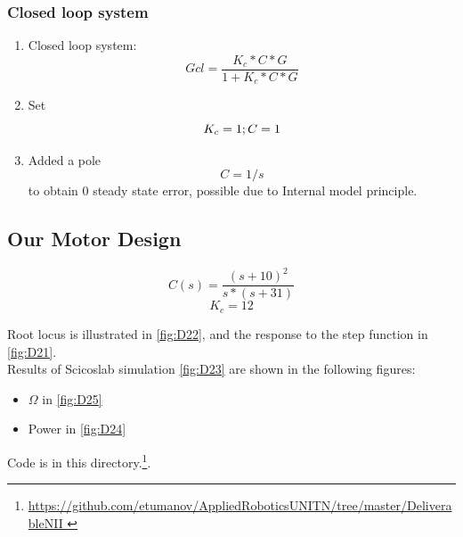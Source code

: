 \documentclass[a4paper,12pt,oneside]{article}
\begin{document}
\begin{enumerate}
\subsubsection{Closed loop system}
\begin{enumerate}
\item Closed loop system: \\

\begin{equation}
Gcl = \frac{K_{c}*C*G}{1 + K_{c}*C*G}
\end{equation}
 
\item Set  \\
\begin{equation} 
K_{c} = 1 ; \\
C = 1
\end{equation} 

\item Added a pole \\
\begin{equation} 
C = 1/s 
\end{equation} 
to obtain 0 steady state error, possible due to Internal model principle.
\end{enumerate}

\subsection{Our Motor Design}
\begin{equation}
C(s) = \frac{(s+10)^2}{s*(s+31)}
\end{equation}
\begin{equation}
K_{c} = 12
\end{equation}



Root locus is illustrated in \cref{fig:D22}, and the response to the step function in \cref{fig:D21}.\\ 
Results of Scicoslab simulation \cref{fig:D23} are shown in the following figures:
\begin{itemize}
\item $\Omega$ in \cref{fig:D25}
\item Power in \cref{fig:D24}
\end{itemize}
Code is in this directory.\footnote{\url{https://github.com/etumanov/AppliedRoboticsUNITN/tree/master/DeliverableNII }}.


\end{enumerate}
\end{document}
